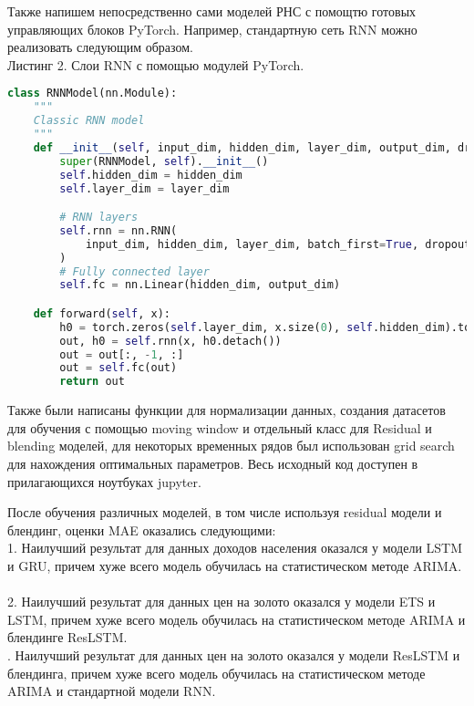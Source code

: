 \documentclass[12pt, a4paper]{article} %
\begin{document}
Также напишем непосредственно сами моделей РНС с помощтю готовых управляющих блоков PyTorch. Например, стандартную сеть RNN можно реализовать следующим образом. \\
Листинг 2. Слои RNN с помощью модулей PyTorch.
\begin{lstlisting}[language=Python]
class RNNModel(nn.Module):
    """
    Classic RNN model
    """
    def __init__(self, input_dim, hidden_dim, layer_dim, output_dim, dropout_prob):
        super(RNNModel, self).__init__()
        self.hidden_dim = hidden_dim
        self.layer_dim = layer_dim

        # RNN layers
        self.rnn = nn.RNN(
            input_dim, hidden_dim, layer_dim, batch_first=True, dropout=dropout_prob
        )
        # Fully connected layer
        self.fc = nn.Linear(hidden_dim, output_dim)

    def forward(self, x):
        h0 = torch.zeros(self.layer_dim, x.size(0), self.hidden_dim).to(device)
        out, h0 = self.rnn(x, h0.detach())
        out = out[:, -1, :]
        out = self.fc(out)
        return out\end{lstlisting}


Также были написаны функции для нормализации данных, создания датасетов для обучения с помощью moving window и отдельный класс для Residual и blending моделей, для некоторых временных рядов был использован grid search для нахождения оптимальных параметров. Весь исходный код доступен в прилагающихся ноутбуках jupyter.

После обучения различных моделей, в том числе используя residual модели и блендинг, оценки MAE оказались следующими:\\
1. Наилучший результат для данных доходов населения оказался у модели LSTM и GRU, причем хуже всего модель обучилась на статистическом методе ARIMA. \\
\\
2. Наилучший результат для данных цен на золото оказался у модели ETS и LSTM, причем хуже всего модель обучилась на статистическом методе ARIMA и блендинге ResLSTM. \\
. Наилучший результат для данных цен на золото оказался у модели ResLSTM и блендинга, причем хуже всего модель обучилась на статистическом методе ARIMA и стандартной модели RNN. \\
\\
\end{document}
